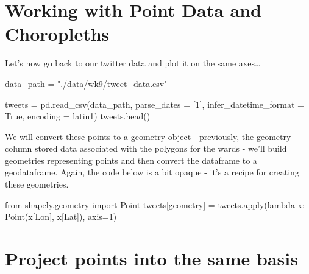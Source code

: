 \documentclass[
  letterpaper,
  DIV=11,
  numbers=noendperiod]{scrreprt}
\newenvironment{Shaded}{\begin{snugshade}}{\end{snugshade}}
\newcommand{\BuiltInTok}[1]{\textcolor[rgb]{0.00,0.23,0.31}{#1}}
\newcommand{\DecValTok}[1]{\textcolor[rgb]{0.68,0.00,0.00}{#1}}
\newcommand{\ImportTok}[1]{\textcolor[rgb]{0.00,0.46,0.62}{#1}}
\newcommand{\KeywordTok}[1]{\textcolor[rgb]{0.00,0.23,0.31}{#1}}
\newcommand{\NormalTok}[1]{\textcolor[rgb]{0.00,0.23,0.31}{#1}}
\newcommand{\OperatorTok}[1]{\textcolor[rgb]{0.37,0.37,0.37}{#1}}
\newcommand{\StringTok}[1]{\textcolor[rgb]{0.13,0.47,0.30}{#1}}
\newcommand{\VariableTok}[1]{\textcolor[rgb]{0.07,0.07,0.07}{#1}}
\begin{document}
\hypertarget{working-with-point-data-and-choropleths}{%
\section{Working with Point Data and
Choropleths}\label{working-with-point-data-and-choropleths}}

Let's now go back to our twitter data and plot it on the same
axes\ldots{}

\begin{Shaded}
\begin{Highlighting}[]
\NormalTok{data\_path }\OperatorTok{=} \StringTok{"./data/wk9/tweet\_data.csv"}

\NormalTok{tweets }\OperatorTok{=}\NormalTok{ pd.read\_csv(data\_path, parse\_dates }\OperatorTok{=}\NormalTok{ [}\DecValTok{1}\NormalTok{], infer\_datetime\_format }\OperatorTok{=} \VariableTok{True}\NormalTok{, encoding }\OperatorTok{=} \StringTok{\textquotesingle{}latin1\textquotesingle{}}\NormalTok{)}
\NormalTok{tweets.head()}
\end{Highlighting}
\end{Shaded}

We will convert these points to a geometry object - previously, the
geometry column stored data associated with the polygons for the wards -
we'll build geometries representing points and then convert the
dataframe to a geodataframe. Again, the code below is a bit opaque -
it's a recipe for creating these geometries.

\begin{Shaded}
\begin{Highlighting}[]
\ImportTok{from}\NormalTok{ shapely.geometry }\ImportTok{import}\NormalTok{ Point}
\NormalTok{tweets[}\StringTok{\textquotesingle{}geometry\textquotesingle{}}\NormalTok{] }\OperatorTok{=}\NormalTok{ tweets.}\BuiltInTok{apply}\NormalTok{(}\KeywordTok{lambda}\NormalTok{ x: Point(x[}\StringTok{\textquotesingle{}Lon\textquotesingle{}}\NormalTok{], x[}\StringTok{\textquotesingle{}Lat\textquotesingle{}}\NormalTok{]), axis}\OperatorTok{=}\DecValTok{1}\NormalTok{)}
\end{Highlighting}
\end{Shaded}

\hypertarget{project-points-into-the-same-basis}{%
\section{Project points into the same
basis}\label{project-points-into-the-same-basis}}
\end{document}
